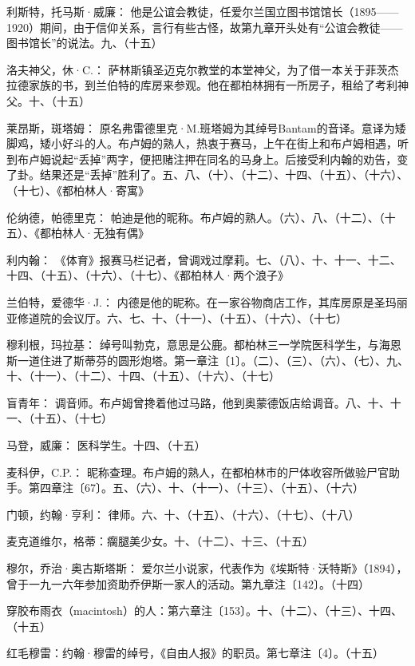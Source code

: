 \par 利斯特，托马斯·威廉： 他是公谊会教徒，任爱尔兰国立图书馆馆长（1895——1920）期间，由于信仰关系，言行有些古怪，故第九章开头处有“公谊会教徒——图书馆长”的说法。九、（十五）
\par 洛夫神父，休·C.： 萨林斯镇圣迈克尔教堂的本堂神父，为了借一本关于菲茨杰拉德家族的书，到兰伯特的库房来参观。他在都柏林拥有一所房子，租给了考利神父。十、（十五）
\par 莱昂斯，斑塔姆： 原名弗雷德里克·M.班塔姆为其绰号Bantam的音译。意译为矮脚鸡，矮小好斗的人。布卢姆的熟人，热衷于赛马，上午在街上和布卢姆相遇，听到布卢姆说起“丢掉”两字，便把赌注押在同名的马身上。后接受利内翰的劝告，变了卦。结果还是“丢掉”胜利了。五、八、（十）、（十二）、十四、（十五）、（十六）、（十七）、《都柏林人·寄寓》
\par 伦纳德，帕德里克： 帕迪是他的昵称。布卢姆的熟人。（六）、八、（十二）、（十五）、《都柏林人·无独有偶》
\par 利内翰： 《体育》报赛马栏记者，曾调戏过摩莉。七、（八）、十、十一、十二、十四、（十五）、（十六）、（十七）、《都柏林人·两个浪子》
\par 兰伯特，爱德华·J.： 内德是他的昵称。在一家谷物商店工作，其库房原是圣玛丽亚修道院的会议厅。六、七、十、（十一）、（十五）、（十六）、（十七）
\par 穆利根，玛拉基： 绰号叫勃克，意思是公鹿。都柏林三一学院医科学生，与海恩斯一道住进了斯蒂芬的圆形炮塔。第一章注〔1〕。（二）、（三）、（六）、（七）、九、十、（十一）、（十二）、十四、（十五）、（十六）、（十七）
\par 盲青年： 调音师。布卢姆曾搀着他过马路，他到奥蒙德饭店给调音。八、十、十一、（十五）、（十七）
\par 马登，威廉： 医科学生。十四、（十五）
\par 麦科伊，C.P.： 昵称查理。布卢姆的熟人，在都柏林市的尸体收容所做验尸官助手。第四章注〔67〕。五、（六）、十、（十一）、（十三）、（十五）、（十六）
\par 门顿，约翰·亨利： 律师。六、十、（十五）、（十六）、（十七）、（十八）
\par 麦克道维尔，格蒂：瘸腿美少女。十、（十二）、十三、（十五）
\par 穆尔，乔治·奥古斯塔斯： 爱尔兰小说家，代表作为《埃斯特·沃特斯》（1894），曾于一九一六年参加资助乔伊斯一家人的活动。第九章注〔142〕。（十四）
\par 穿胶布雨衣（macintosh）的人：第六章注〔153〕。十、（十二）、（十三）、十四、（十五）
\par 红毛穆雷：约翰·穆雷的绰号，《自由人报》的职员。第七章注〔4〕。（十五）
